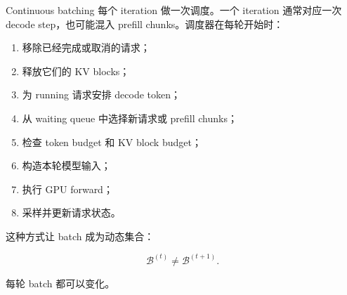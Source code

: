 Continuous batching 每个 iteration 做一次调度。一个 iteration 通常对应一次 decode step，也可能混入 prefill chunks。调度器在每轮开始时：

\begin{enumerate}
\item 移除已经完成或取消的请求；
\item 释放它们的 KV blocks；
\item 为 running 请求安排 decode token；
\item 从 waiting queue 中选择新请求或 prefill chunks；
\item 检查 token budget 和 KV block budget；
\item 构造本轮模型输入；
\item 执行 GPU forward；
\item 采样并更新请求状态。
\end{enumerate}

这种方式让 batch 成为动态集合：

\[
\mathcal{B}^{(t)}
\ne
\mathcal{B}^{(t+1)}.
\]

每轮 batch 都可以变化。

